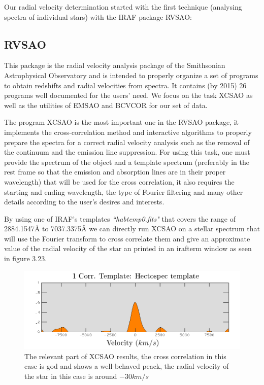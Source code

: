 Our radial velocity determination started with the first technique (analysing spectra of individual stars) with the IRAF package RVSAO:

\subsection{RVSAO}

This package is the radial velocity analysis package of the Smithsonian Astrophysical Observatory and is intended to properly organize a set of programs to obtain redshifts and radial velocities from spectra. It contains (by 2015) 26 programs well documented for the users' need. We focus on the task XCSAO as well as the utilities of EMSAO and BCVCOR for our set of data.

The program XCSAO is the most important one in the RVSAO package, it implements the cross-correlation method and interactive algorithms to properly prepare the spectra for a correct radial velocity analysis such as the removal of the continuum and the emission line suppression. For using this task, one must provide the spectrum of the object and a template spectrum (preferably in the rest frame so that the emission and absorption lines are in their proper wavelength) that will be used for the cross correlation, it also requires the starting and ending wavelength, the type of Fourier filtering and many other details according to the user's desires and interests.

By using one of IRAF's templates \textit{``habtemp0.fits"} that covers the range of 2884.1547$\textrm{\AA}$ to 7037.3375$\textrm{\AA}$ we can directly run XCSAO on a stellar spectrum that will use the Fourier transform to cross correlate them and give an approximate value of the radial velocity of the star an printed in an irafterm window as seen in figure 3.23. 

\begin{figure}[H]
\centering
\includegraphics[width=12cm]{images/xcsao.png}
\caption[XCSAO results]{The relevant part of XCSAO results, the cross correlation in this case is god and shows a well-behaved peack, the radial velocity of the star in this case is around $-30km/s$}
\end{figure}

